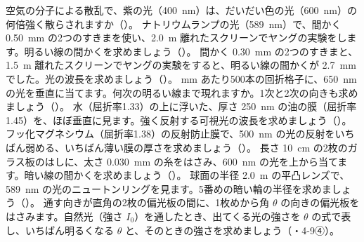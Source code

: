 \bkendproblems
{}
\bkproblem 空気の分子による散乱で、紫の光（\qty{400}{nm}）は、だいだい色の光（\qty{600}{nm}）の何倍強く散らされますか（\nobreak{}\nobreak）。
\bkproblem ナトリウムランプの光（\qty{589}{nm}）で、間かく \qty{0.50}{mm} の2つのすきまを使い、\qty{2.0}{m} 離れたスクリーンでヤングの実験をします。明るい線の間かくを求めましょう（\nobreak{}\nobreak）。
\bkproblem 間かく \qty{0.30}{mm} の2つのすきまと、\qty{1.5}{m} 離れたスクリーンでヤングの実験をすると、明るい線の間かくが \qty{2.7}{mm} でした。光の波長を求めましょう（\nobreak{}\nobreak）。
 mm あたり500本の回折格子に、\qty{650}{nm} の光を垂直に当てます。何次の明るい線まで現れますか。1次と2次の向きも求めましょう（\nobreak{}\nobreak）。
\bkproblem 水（屈折率1.33）の上に浮いた、厚さ \qty{250}{nm} の油の膜（屈折率1.45）を、ほぼ垂直に見ます。強く反射する可視光の波長を求めましょう（\nobreak{}\nobreak）。
\bkproblem フッ化マグネシウム（屈折率1.38）の反射防止膜で、\qty{500}{nm} の光の反射をいちばん弱める、いちばん薄い膜の厚さを求めましょう（\nobreak{}\nobreak）。
\bkproblem 長さ \qty{10}{cm} の2枚のガラス板のはしに、太さ \qty{0.030}{mm} の糸をはさみ、\qty{600}{nm} の光を上から当てます。暗い線の間かくを求めましょう（\nobreak{}\nobreak）。
\bkproblem 球面の半径 \qty{2.0}{m} の平凸レンズで、\qty{589}{nm} の光のニュートンリングを見ます。5番めの暗い輪の半径を求めましょう（\nobreak{}\nobreak）。
\bkproblem 通す向きが直角の2枚の偏光板の間に、1枚めから角 $\theta$ の向きの偏光板をはさみます。自然光（強さ $I_0$）を通したとき、出てくる光の強さを $\theta$ の式で表し、いちばん明るくなる $\theta$ と、そのときの強さを求めましょう（\nobreak{}\nobreak・4-9④）。
